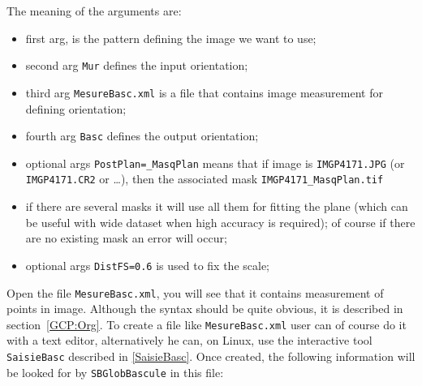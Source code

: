 The meaning of the arguments are:

\begin{itemize}
  \item first arg, is the pattern defining the image we want to use;

  \item second arg {\tt Mur} defines the input orientation;

  \item third arg {\tt MesureBasc.xml} is a file that contains image measurement
        for defining orientation;

  \item fourth  arg {\tt Basc} defines the output orientation;

  \item optional args {\tt PostPlan=\_MasqPlan}  means that if image is {\tt IMGP4171.JPG}
        (or {\tt IMGP4171.CR2} or \dots), then the associated mask {\tt IMGP4171\_MasqPlan.tif}

   \item  if there are several masks it will use all them for
         fitting the plane (which can be useful with wide dataset when high accuracy  is required);
         of course if there are no existing mask an error will occur;

  \item optional args {\tt DistFS=0.6} is used to fix the scale;
\end{itemize}


Open the file {\tt MesureBasc.xml}, you will see that it contains measurement
of points in image. Although the syntax should be quite obvious, it is
described in section~\ref{GCP:Org}. To create a file like {\tt MesureBasc.xml}
user can of course do it with a text editor, alternatively he can, on Linux,
use the interactive tool {\tt SaisieBasc}  described in \ref{SaisieBasc}.
Once created, the following information will be looked for by  {\tt SBGlobBascule}
in this file:

